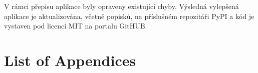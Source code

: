 \documentclass[%
  12pt,       				%
  a4paper,    				%
	unicode,						%
]{report}				    	%
\begin{document}
V rámci přepisu aplikace byly opraveny existující chyby. Výsledná vylepšená aplikace je aktualizována, včetně popisků, na příslušném repozitáři PyPI a kód je vystaven pod licencí MIT na portalu GitHUB.\\


\vytvorprohlaseni

\vytvorpodekovani

\vytvorpodekovaniSIX

\obsah




\cleardoublepage\pagestyle{plain}   %










%







%


\appendix
\appendixpage
\section*{List of Appendices}
\startcontents[chapters]

\end{document}
